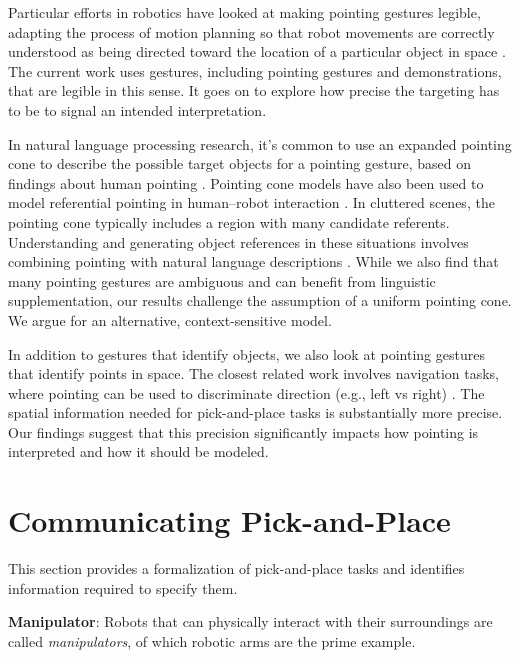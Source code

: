 \documentclass[letterpaper]{article} %
\begin{document}
Particular efforts in robotics have looked at making pointing gestures legible, adapting the process of motion planning so that robot movements are correctly understood as being directed toward the location of a particular object in space \cite{holladay2014legible,zhao2016experimental}.  The current work uses gestures, including pointing gestures and demonstrations, that are legible in this sense. It goes on to explore how precise the targeting has to be to signal an intended interpretation.

In natural language processing research, it's common to use an expanded pointing cone to describe the possible target objects for a pointing gesture, based on findings about human pointing \cite{kranstedt2003deixis,rieser2004pointing}.  Pointing cone models have also been used to model referential pointing in human--robot interaction \cite{whitney2016interpreting,whitney2017reducing}. In cluttered scenes, the pointing cone typically includes a region with many candidate referents.  Understanding and generating object references in these situations involves combining pointing with natural language descriptions \cite{han2018placing,kollar2014grounding}.  While we also find that many pointing gestures are ambiguous and can benefit from linguistic supplementation, our results challenge the assumption of a uniform pointing cone. We argue for an alternative, context-sensitive model.

In addition to gestures that identify objects, we also look at pointing gestures that identify points in space. The closest related work involves navigation tasks, where pointing can be used to discriminate direction (e.g., left vs right) \cite{mei2016listen,tellex2011understanding}. The spatial information needed for pick-and-place tasks is substantially more precise. Our findings suggest that this precision significantly impacts how pointing is interpreted and how it should be modeled.




\section{Communicating Pick-and-Place}
\label{problem}

This section provides a formalization of pick-and-place tasks and identifies information required to specify them.
 
\noindent\textbf{Manipulator}: Robots that can physically interact with their surroundings are called \textit{manipulators}, of which robotic arms are the prime example. 
\end{document}
